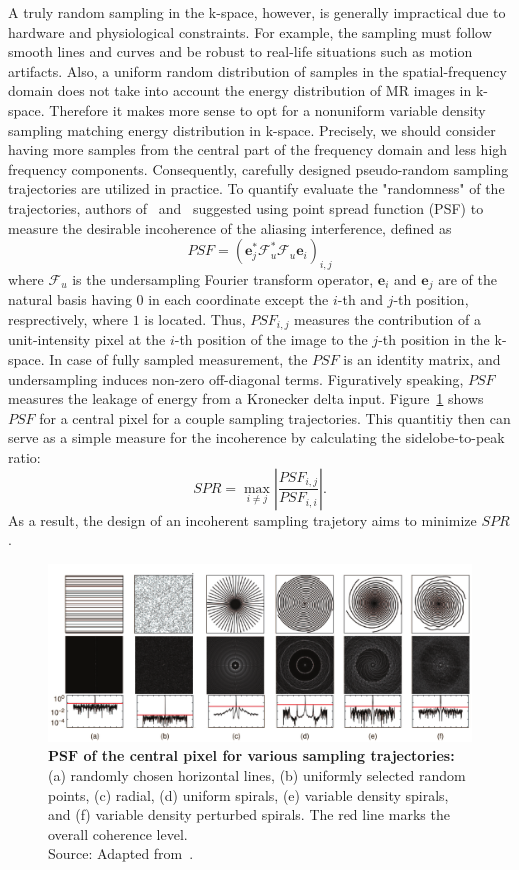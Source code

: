 A truly random sampling in the k-space, however, is generally impractical due to hardware and physiological constraints. For example, the sampling must follow smooth lines and curves and be robust to real-life situations such as motion artifacts. Also, a uniform random distribution of samples in the spatial-frequency domain does not take into account the energy distribution of MR images in k-space. Therefore it makes more sense to opt for a nonuniform variable density sampling matching energy distribution in k-space. Precisely, we should consider having more samples from the central part of the frequency domain and less high frequency components. Consequently, carefully designed pseudo-random sampling trajectories are utilized in practice. To quantify  evaluate the "randomness" of the trajectories, authors of~\cite{lustig_compressed_2008} and~\cite{lustig_sparse_2007} suggested using point spread function (PSF) to measure the desirable incoherence of the aliasing interference, defined as
\[PSF = (\mathbf{e}_j^* \mathcal{F}_u^* \mathcal{F}_u \mathbf{e}_i)_{i,j}\]
where $\mathcal{F}_u$ is the undersampling Fourier transform operator, $\mathbf{e}_i$ and $\mathbf{e}_j$ are of the natural basis having $0$ in each coordinate except the $i$-th and $j$-th position, resprectively, where $1$ is located. Thus, $PSF_{i,j}$ measures the contribution of a unit-intensity pixel at the $i$-th position of the image to the $j$-th position in the k-space. In case of fully sampled measurement, the $PSF$ is an identity matrix, and undersampling induces non-zero off-diagonal terms. Figuratively speaking, $PSF$ measures the leakage of energy from a Kronecker delta input. Figure~\ref{fig:trajectory_coherence} shows $PSF$ for a central pixel for a couple sampling trajectories. This quantitiy then can serve as a simple measure for the incoherence by calculating the sidelobe-to-peak ratio:
\[SPR = \max_{i \ne j} \left|\frac{PSF_{i,j}}{PSF_{i,i}}\right|.\]
As a result, the design of an incoherent sampling trajetory aims to minimize $SPR$.

\begin{figure}
    \centering
    \includegraphics[width=0.98\linewidth]{images/PSF_trajectories.png}
    \caption{\textbf{$\mathbf{PSF}$ of the central pixel for various sampling trajectories:} (a) randomly chosen horizontal lines, (b) uniformly selected random points, (c) radial, (d) uniform spirals, (e) variable density spirals, and (f) variable density perturbed spirals. The red line marks the overall coherence level.\\
    Source: Adapted from~\cite{lustig_compressed_2008}.}
    \label{fig:trajectory_coherence}
\end{figure}

